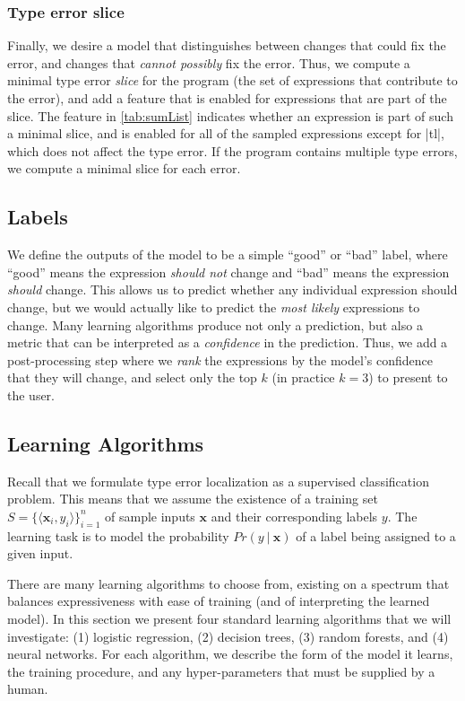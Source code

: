 \subsubsection{Type error slice}
Finally, we desire a model that distinguishes between
changes that could fix the error, and changes that
\emph{cannot possibly} fix the error.
%
Thus, we compute a minimal type error \emph{slice} for the program
(\ie the set of expressions that contribute to the error), and add a
feature that is enabled for expressions that are part of the slice.
%
The \InSlice feature in \autoref{tab:sumList} indicates whether an
expression is part of such a minimal slice, and is enabled for all of
the sampled expressions except for |tl|, which does not affect
the type error.
%
If the program contains multiple type errors, we compute
a minimal slice for each error.

\subsection{Labels}
\label{sec:labels}
We define the outputs of the model to be a simple ``good'' or ``bad''
label, where ``good'' means the expression \emph{should not} change and
``bad'' means the expression \emph{should} change. 
%
This allows us to predict whether any individual expression should
change, but we would actually like to predict the \emph{most likely}
expressions to change.
%
Many learning algorithms produce not only a prediction, but also a
metric that can be interpreted as a \emph{confidence} in the prediction.
%
Thus, we add a post-processing step where we \emph{rank} the expressions
by the model's confidence that they will change, and select only the top
$k$ (in practice $k=3$) to present to the user.

\subsection{Learning Algorithms}
\label{sec:models}
\lstDeleteShortInline{|} %

Recall that we formulate type error localization as a supervised
classification problem.
%
This means that we assume the existence of a training set
$S = \{\langle \mathbf{x}_i, y_i \rangle\}_{i=1}^{n}$
of sample inputs $\mathbf{x}$ and their corresponding labels $y$.
%
The learning task is to model the probability $Pr(y\ |\ \mathbf{x})$
of a label being assigned to a given input.

There are many learning algorithms to choose from, existing
on a spectrum that balances expressiveness with ease of training (and of
interpreting the learned model).
%
In this section we present four standard learning algorithms that we
will investigate:
%
(1) logistic regression,
(2) decision trees,
(3) random forests, and
(4) neural networks.
%
For each algorithm, we describe the form of the model it learns, the
training procedure, and any hyper-parameters that must be supplied by a
human.

